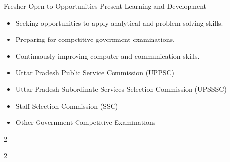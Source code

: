 \documentclass[10pt,a4paper,ragged2e]{maltacv}
\begin{document}


\cvexperience
{Fresher}
{Open to Opportunities}
{Present}
{}
{Learning and Development}

\begin{itemize}
\item Seeking opportunities to apply analytical and problem-solving skills.
\item Preparing for competitive government examinations.
\item Continuously improving computer and communication skills.
\end{itemize}



\begin{itemize}
\item Uttar Pradesh Public Service Commission (UPPSC)
\item Uttar Pradesh Subordinate Services Selection Commission (UPSSSC)
\item Staff Selection Commission (SSC)
\item Other Government Competitive Examinations
\end{itemize}



\begin{multicols}{2}


\end{multicols}



\begin{multicols}{2}


\end{multicols}

\end{document}
